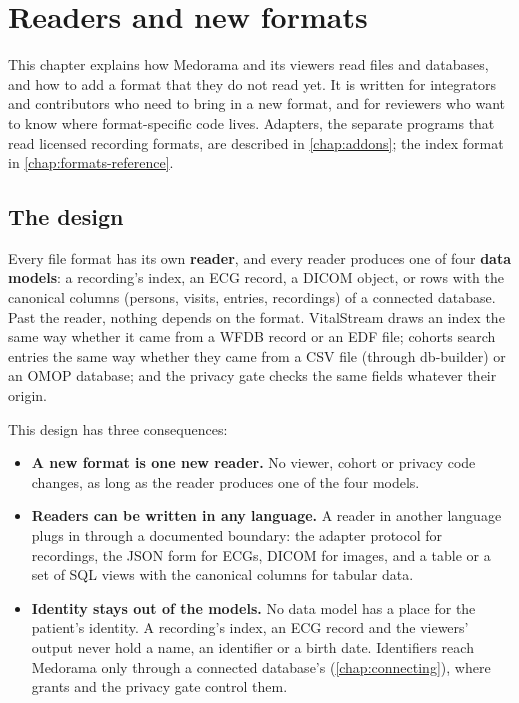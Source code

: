 \chapter{Readers and new formats}
\label{chap:readers}

This chapter explains how Medorama and its viewers read files and databases, and how to add a
format that they do not read yet. It is written for integrators and contributors who need to
bring in a new format, and for reviewers who want to know where format-specific code lives.
Adapters, the separate programs that read licensed recording formats, are described in
\cref{chap:addons}; the index format in \cref{chap:formats-reference}.


\section{The design}
\label{sec:readers-design}

Every file format has its own \textbf{reader}, and every reader produces one of four
\textbf{data models}: a recording's index, an ECG record, a DICOM object, or rows with the
canonical columns (persons, visits, entries, recordings) of a connected database. Past the reader,
nothing depends on the format. VitalStream draws an index the same way whether it came from a WFDB
record or an EDF file; cohorts search entries the same way whether they came from a CSV file
(through db-builder) or an OMOP database; and the privacy gate checks the
same fields whatever their origin.

This design has three consequences:
\begin{itemize}
\item \textbf{A new format is one new reader.} No viewer, cohort or privacy code changes, as long
  as the reader produces one of the four models.
\item \textbf{Readers can be written in any language.} A reader in another language plugs in
  through a documented boundary: the adapter protocol for recordings, the JSON form for ECGs,
  DICOM for images, and a table or a set of SQL views with the canonical columns for tabular
  data.
\item \textbf{Identity stays out of the models.} No data model has a place for the patient's
  identity. A recording's index, an ECG record and the viewers' output never hold a name, an
  identifier or a birth date. Identifiers reach Medorama only through a connected database's
   (\cref{chap:connecting}), where grants and the privacy gate control them.
\end{itemize}

